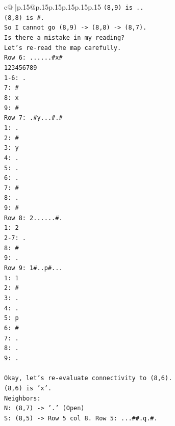 \documentclass{article}
\begin{document}
{\begin{supertabular}{c@{$\;$}|p{.15\linewidth}@{}p{.15\linewidth}p{.15\linewidth}p{.15\linewidth}p{.15\linewidth}p{.15\linewidth}}
{{{\texttt{(8,9) is ..} \\
\texttt{(8,8) is \#.} \\
\texttt{So I cannot go (8,9) {-}> (8,8) {-}> (8,7).} \\
\texttt{Is there a mistake in my reading?} \\
\texttt{Let's re{-}read the map carefully.} \\
\texttt{Row 6: ......\#x\#} \\
\texttt{123456789} \\
\texttt{1{-}6: .} \\
\texttt{7: \#} \\
\texttt{8: x} \\
\texttt{9: \#} \\
\texttt{Row 7: .\#y...\#.\#} \\
\texttt{1: .} \\
\texttt{2: \#} \\
\texttt{3: y} \\
\texttt{4: .} \\
\texttt{5: .} \\
\texttt{6: .} \\
\texttt{7: \#} \\
\texttt{8: .} \\
\texttt{9: \#} \\
\texttt{Row 8: 2......\#.} \\
\texttt{1: 2} \\
\texttt{2{-}7: .} \\
\texttt{8: \#} \\
\texttt{9: .} \\
\texttt{Row 9: 1\#..p\#...} \\
\texttt{1: 1} \\
\texttt{2: \#} \\
\texttt{3: .} \\
\texttt{4: .} \\
\texttt{5: p} \\
\texttt{6: \#} \\
\texttt{7: .} \\
\texttt{8: .} \\
\texttt{9: .} \\
\\ 
\texttt{Okay, let's re{-}evaluate connectivity to (8,6).} \\
\texttt{(8,6) is 'x'.} \\
\texttt{Neighbors:} \\
\texttt{N: (8,7) {-}> '.' (Open)} \\
\texttt{S: (8,5) {-}> Row 5 col 8. Row 5: ...\#\#.q.\#.} \\
}}}
\end{supertabular}}
\end{document}
